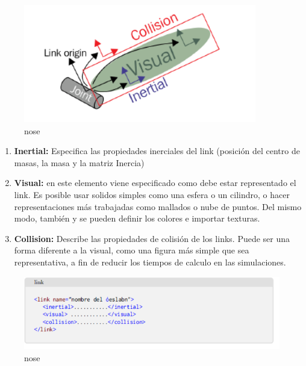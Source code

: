         \begin{figure}[htb]
            \centering
            \includegraphics[width=0.8\linewidth]{Main/Chapter3/Images3/3-7/eslabon2.png}
            \caption{nose}
            \label{f:Cap3-7_noseee_urdf}
        \end{figure} 

        \begin{enumerate}
            \item \textbf{Inertial:} Especifica las propiedades inerciales del link (posición del centro de masas, la masa y la matriz Inercia)
            \item \textbf{Visual:} en este elemento viene especificado como debe estar representado el link. Es posible usar solidos simples como una esfera o un cilindro, o hacer representaciones más trabajadas como mallados o nube de puntos. Del mismo modo, también y se pueden definir los colores e importar texturas.
            \item \textbf{Collision:} Describe las propiedades de colisión de los links. Puede ser una forma diferente a la visual, como una figura más simple que sea representativa, a fin de reducir los tiempos de calculo en las simulaciones.
        \end{enumerate}
        
        \begin{figure}[htb]
            \centering
            \includegraphics[width=1.0\linewidth]{Main/Chapter3/Images3/3-7/codigo.png}
            \caption{nose}
            \label{f:Cap3-7_nose_nose}
        \end{figure} 
        
